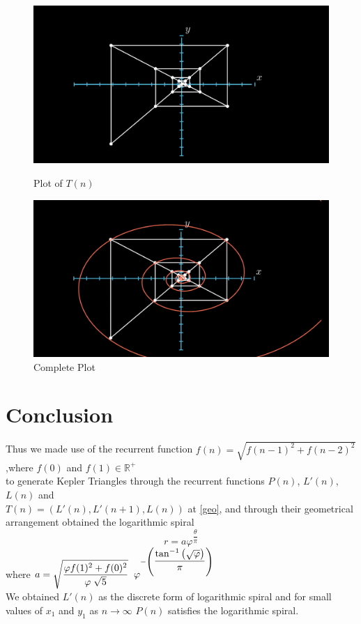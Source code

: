 \documentclass{article}
\begin{document}
\begin{figure}[t]
	\centering
	\begin{minipage}{0.45\textwidth}
		\centering
		\includegraphics[scale=0.23, trim={3cm 0 6cm 0}, clip]{images/GFKT7.png}
		\caption{Plot of $T(n)$}
	\end{minipage}\hfill
	\begin{minipage}{0.45\textwidth}
		\centering
		\includegraphics[scale=0.23, trim={3cm 0 6cm 0}, clip]{images/GFKT8.png}
		\caption{Complete Plot}
	\end{minipage}
\end{figure}
\clearpage
\section{Conclusion}
Thus we made use of the recurrent function $f(n) = \sqrt{f(n-1)^2 + f(n-2)^2}$,where  $f(0)$ and $f(1) \in \mathbb{R}^{+}$\\ to generate Kepler Triangles through the recurrent functions $P(n)$, $L'(n)$, $L(n)$ and\\ $T(n) = (L'(n), L'(n+1), L(n))$ at \ref{geo}, and through their geometrical arrangement obtained the logarithmic spiral {\large$$r = a\varphi^{\dfrac{\theta}{\pi}}$$}
where $a = \sqrt{\dfrac{\varphi f(1)^2 + f(0)^2}{\varphi\hspace{1mm}\sqrt{5}}}\hspace{2mm}\varphi^{-\left(\dfrac{ \tan^{-1}{\left(\sqrt{\varphi}\right)}}{\pi}\right)}$\\
We obtained $L'(n)$ as the discrete form of logarithmic spiral and for small values of $x_1$ and $y_1$ as $n \to \infty$ $P(n)$ satisfies the logarithmic spiral.
\end{document}

